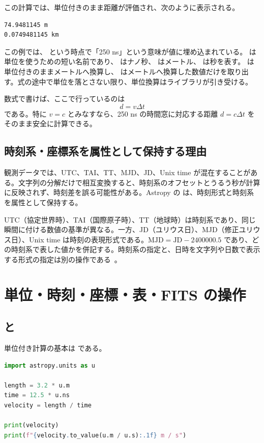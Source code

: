 この計算では、単位付きのまま距離が評価され、次のように表示される。

\begin{lstlisting}[numbers=none, xleftmargin=2\zw]
74.9481145 m
0.0749481145 km
\end{lstlisting}

この例では、 という時点で「250 ns」という意味が値に埋め込まれている。 は単位を使うための短い名前であり、 はナノ秒、 はメートル、 は秒を表す。 は単位付きのままメートルへ換算し、 はメートルへ換算した数値だけを取り出す。式の途中で単位を落とさない限り、単位換算はライブラリが引き受ける。

数式で書けば、ここで行っているのは
\[
d = v \Delta t
\]
である。特に \(v = c\) とみなすなら、250 ns の時間窓に対応する距離 \(d = c \Delta t\) をそのまま安全に計算できる。

\subsection{時刻系・座標系を属性として保持する理由}

観測データでは、UTC、TAI、TT、MJD、JD、Unix time が混在することがある。文字列の分解だけで相互変換すると、時刻系のオフセットとうるう秒が計算に反映されず、時刻差を誤る可能性がある。Astropy の  は、時刻形式と時刻系を属性として保持する。

UTC（協定世界時）、TAI（国際原子時）、TT（地球時）は時刻系であり、同じ瞬間に付ける数値の基準が異なる。一方、JD（ユリウス日）、MJD（修正ユリウス日）、Unix time は時刻の表現形式である。\(\mathrm{MJD}=\mathrm{JD}-2400000.5\) であり、どの時刻系で表した値かを併記する。時刻系の指定と、日時を文字列や日数で表示する形式の指定は別の操作である~\cite{astropy_time}。

\section{単位・時刻・座標・表・FITS の操作}

\subsection{ と }

単位付き計算の基本は  である。

\begin{lstlisting}[language=Python]
import astropy.units as u

length = 3.2 * u.m
time = 12.5 * u.ns
velocity = length / time

print(velocity)
print(f"{velocity.to_value(u.m / u.s):.1f} m / s")
\end{lstlisting}

